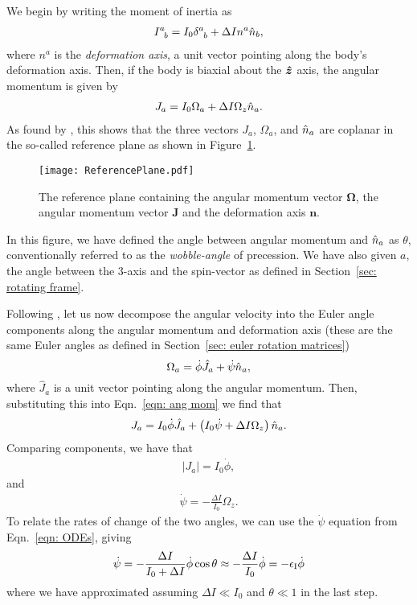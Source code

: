 \documentclass[../full_thesis/full_thesis.tex]{subfiles}
\begin{document}
We begin by writing the moment of inertia as
\begin{align}
I^{a}_{\;\;b} = I_{0} \delta^{a}_{\;\;b} + \Delta I n^a \hat{n}_b,
\end{align}
where $n^a$ is the \emph{deformation axis}, a unit vector pointing along the
body's deformation axis. Then, if the body is biaxial about the $\boldsymbol{\hat{z}}$ axis,
the angular momentum is given by
\begin{align}
J_{a} = I_0 \Omega_a + \Delta I \Omega_z \hat{n}_a.
\label{eqn: ang mom}
\end{align}
As found by \citet{Pines1972}, this shows that the three vectors $J_a$,
$\Omega_a$, and $\hat{n}_a$ are coplanar in the so-called reference plane as shown in
Figure~\ref{fig: reference plane}.
\begin{figure}[htb]
    \texttt{[image: ReferencePlane.pdf]}
    \caption{The reference plane containing the angular momentum vector $\mathbf{\Omega}$,
    the angular momentum vector $\mathbf{J}$ and the deformation axis $\mathbf{n}$.}
    \label{fig: reference plane}
\end{figure}
In this figure, we have defined the angle between angular momentum and $\hat{n}_a$ as
$\theta$, conventionally referred to as the \emph{wobble-angle} of
precession. We have also given $a$, the angle between the 3-axis and the
spin-vector as defined in Section~\ref{sec: rotating frame}.

Following \citet{Jones2001}, let us now decompose the angular velocity into the
Euler angle components along the angular momentum and deformation axis (these
are the same Euler angles as defined in Section~\ref{sec: euler rotation
matrices})
\begin{equation}
  \Omega_a = \dot{\phi}\hat{J}_a + \dot{\psi}\hat{n}_{a},
\label{eqn: decomp}
\end{equation}
where $\hat{J}_a$ is a unit vector pointing along the angular momentum. Then,
substituting this into Eqn.~\eqref{eqn: ang mom} we find that
\begin{align}
J_a = I_0 \dot{\phi} \hat{J}_a + \left(I_0 \dot{\psi} + \Delta I \Omega_z\right)\hat{n}_a.
\end{align}
Comparing components, we have that
\begin{align}
|J_a| = I_0 \dot{\phi},
\end{align}
and
\begin{align}
\dot{\psi} = -\frac{\Delta I}{I_0} \Omega_z.
\end{align}
To relate the rates of change of the two angles, we can use the $\dot{\psi}$
equation from Eqn.~\eqref{eqn: ODEs}, giving
\begin{align}
\dot{\psi} = - \frac{\Delta I}{I_0 + \Delta I} \dot{\phi} \cos\theta
\approx -\frac{\Delta I}{I_0} \dot{\phi} = -\epsilon_{\mathrm{I}} \dot{\phi}
\label{eqn: psi phi}
\end{align}
where we have approximated assuming $\Delta I \ll I_0$ and $\theta \ll 1$ in
the last step.
\end{document}
